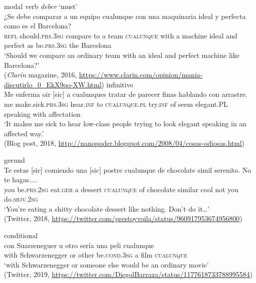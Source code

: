 \documentclass[output=paper,colorlinks,citecolor=brown]{langscibook}
\begin{document}
\begin{exe}[(102)]
    \ex \label{ex:fk99}
    modal verb \textit{deber} ‘must’\\
    \gll ¿Se debe comparar a un equipo cualunque con una maquinaria ideal y perfecta como es el Barcelona?\\
    \textsc{refl} should.\textsc{prs.3sg} compare to a team \textsc{cualunque} with a machine ideal and perfect as be.\textsc{prs.3sg} the Barcelona\\
    \glt ‘Should we compare an ordinary team with an ideal and perfect machine like Barcelona?’\\
    (\textit{Clarín} magazine, 2016, \url{https://www.clarin.com/opinion/mania-discutirlo_0_EkX9qo-XW.html})
    \ex \label{ex:fk100}  
    infinitive\\
    \gll Me enferma {oir [sic]} a cualunques tratar de parecer finas hablando con arrastre.\\
    me make.sick.\textsc{prs.3sg} hear.\textsc{inf} to \textsc{cualunque}.\textsc{pl} try.\textsc{inf} of seem elegant.PL speaking with affectation\\
    \glt ‘It makes me sick to hear low-class people trying to look elegant speaking in an affected way.’\\
    (Blog post, 2018, \url{http://nanopoder.blogspot.com/2008/04/cosas-odiosas.html})
    
    \ex \label{ex:fk101}
    gerund\\
    \gll Te {estas [sic]} comiendo {una [sic]} postre cualunque de chocolate simil serenito. No te hagas....\\
    you be.\textsc{prs.2sg} eat.\textsc{ger} a dessert \textsc{cualunque} of chocolate similar cool not you do.\textsc{sbjv.2sg}\\
    \glt ‘You’re eating a shitty chocolate dessert like nothing. Don’t do it…’\\
    (Twitter, 2018, \url{https://twitter.com/prestoyvoila/status/960917953674956800})
    
    \ex \label{ex:fk102}
    conditional\\
    \gll con Suarseneguer u otro sería una peli cualunque\\
    with Schwarzenegger or other be.\textsc{cond.3sg} a film \textsc{cualunque}\\
    \glt ‘with Schwarzenegger or someone else would be an ordinary movie’\\
    (Twitter, 2019, \url{https://twitter.com/DiegolBarraza/status/1177618733788995584})
\end{exe}

{\sloppy\printbibliography[heading=subbibliography,notkeyword=this]}
\end{document}
